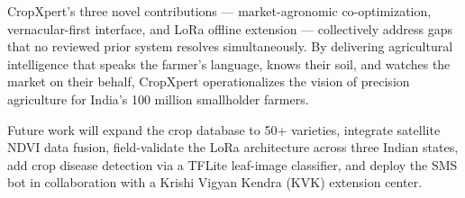 \documentclass[10pt,twocolumn]{article}
\begin{document}
CropXpert's three novel contributions --- market-agronomic co-optimization, vernacular-first interface, and LoRa offline extension --- collectively address gaps that no reviewed prior system resolves simultaneously. By delivering agricultural intelligence that speaks the farmer's language, knows their soil, and watches the market on their behalf, CropXpert operationalizes the vision of precision agriculture for India's 100 million smallholder farmers.

Future work will expand the crop database to 50+ varieties, integrate satellite NDVI data fusion, field-validate the LoRa architecture across three Indian states, add crop disease detection via a TFLite leaf-image classifier, and deploy the SMS bot in collaboration with a Krishi Vigyan Kendra (KVK) extension center.

\end{document}
